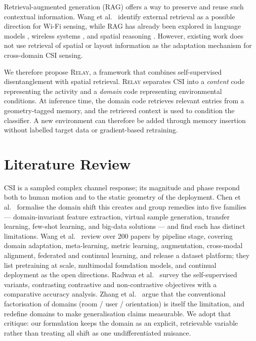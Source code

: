 \documentclass[conference]{IEEEtran}
\newcommand{\method}{\textsc{Relay}}
\begin{document}
Retrieval-augmented generation (RAG) offers a way to preserve and reuse such contextual
information. Wang et al.\ \cite{Wang2025GeneralizabilitySurvey} identify external
retrieval as a possible direction for Wi-Fi sensing, while RAG has already been explored
in language models \cite{lewis2020rag}, wireless systems
\cite{Nazar2024Enwar,Nazar2026Enwar2,wi_chat}, and spatial reasoning
\cite{spatial_rag}. However, existing work does not use retrieval of spatial or layout
information as the adaptation mechanism for cross-domain CSI sensing.

We therefore propose \method{}, a framework that combines self-supervised
disentanglement with spatial retrieval. \method{} separates CSI into a \emph{content}
code representing the activity and a \emph{domain} code representing environmental
conditions. At inference time, the domain code retrieves relevant entries from a
geometry-tagged memory, and the retrieved context is used to condition the classifier.
A new environment can therefore be added through memory insertion without labelled
target data or gradient-based retraining.


\section{Literature Review}
\label{sec:related}

CSI is a sampled complex channel response; its magnitude and phase respond both to human
motion and to the static geometry of the deployment. Chen et al.\ \cite{Chen2022Survey}
formalise the domain shift this creates and group remedies into five families ---
domain-invariant feature extraction, virtual sample generation, transfer learning,
few-shot learning, and big-data solutions --- and find each has distinct limitations.
Wang et al.\ \cite{Wang2025GeneralizabilitySurvey} review over 200 papers by pipeline
stage, covering domain adaptation, meta-learning, metric learning, augmentation,
cross-modal alignment, federated and continual learning, and release a dataset platform;
they list pretraining at scale, multimodal foundation models, and continual deployment as
the open directions. Radwan et al.\ \cite{Radwan2025Survey} survey the self-supervised
variants, contrasting contrastive and non-contrastive objectives with a comparative
accuracy analysis. Zhang et al.\ \cite{Zhang2026BeyondLabels} argue that the conventional
factorisation of domains (room / user / orientation) is itself the limitation, and
redefine domains to make generalisation claims measurable. We adopt that critique: our
formulation keeps the domain as an explicit, retrievable variable rather than treating all
shift as one undifferentiated nuisance.
\end{document}

